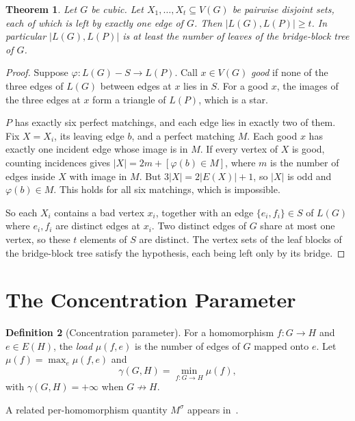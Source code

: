 \documentclass{article}
\newtheorem{theorem}{Theorem}[section]
\theoremstyle{definition}
\newtheorem{definition}[theorem]{Definition}
\begin{document}
\begin{theorem}
\label{thm:jaeger}
Let $G$ be cubic.  Let $X_1,\dots,X_t\subseteq V(G)$ be pairwise disjoint sets,
each of which is left by exactly one edge of $G$.  Then $|L(G),L(P)|\ge t$.  In
particular $|L(G),L(P)|$ is at least the number of leaves of the bridge-block tree
of $G$.
\end{theorem}

\begin{proof}
Suppose $\varphi\colon L(G)-S\to L(P)$.  Call $x\in V(G)$ \emph{good} if none of
the three edges of $L(G)$ between edges at $x$ lies in $S$.  For a good $x$, the
images of the three edges at $x$ form a triangle of $L(P)$, which is a star.

$P$ has exactly six perfect matchings, and each edge lies in exactly two of them.
Fix $X=X_i$, its leaving edge $b$, and a perfect matching $M$.  Each good $x$ has
exactly one incident edge whose image is in $M$.  If every vertex of $X$ is good,
counting incidences gives $|X|=2m+[\varphi(b)\in M]$, where $m$ is the number of
edges inside $X$ with image in $M$.  But $3|X|=2|E(X)|+1$, so $|X|$ is odd and
$\varphi(b)\in M$.  This holds for all six matchings, which is impossible.

So each $X_i$ contains a bad vertex $x_i$, together with an edge
$\{e_i,f_i\}\in S$ of $L(G)$ where $e_i,f_i$ are distinct edges at $x_i$.  Two
distinct edges of $G$ share at most one vertex, so these $t$ elements of $S$ are
distinct.  The vertex sets of the leaf blocks of the bridge-block tree satisfy
the hypothesis, each being left only by its bridge.
\end{proof}

\section{The Concentration Parameter}

\begin{definition}[Concentration parameter]
\label{def:gamma}
For a homomorphism $f\colon G\to H$ and $e\in E(H)$, the \emph{load} $\mu(f,e)$
is the number of edges of $G$ mapped onto $e$.  Let
$\mu(f)=\max_{e}\mu(f,e)$ and
\[
  \gamma(G,H) = \min_{f\colon G\to H} \mu(f),
\]
with $\gamma(G,H)=+\infty$ when $G\not\to H$.
\end{definition}

A related per-homomorphism quantity $M^\sigma$ appears in~\cite{daneshgar2007}.
\end{document}
